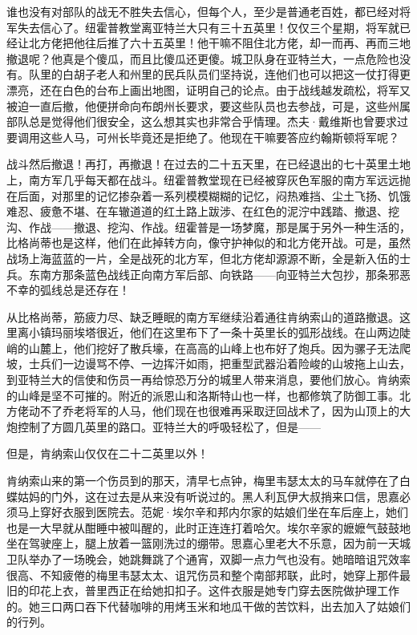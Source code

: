 \par 谁也没有对部队的战无不胜失去信心，但每个人，至少是普通老百姓，都已经对将军失去信心了。纽霍普教堂离亚特兰大只有三十五英里！仅仅三个星期，将军就已经让北方佬把他往后推了六十五英里！他干嘛不阻住北方佬，却一而再、再而三地撤退呢？他真是个傻瓜，而且比傻瓜还更傻。城卫队身在亚特兰大，一点危险也没有。队里的白胡子老人和州里的民兵队员们坚持说，连他们也可以把这一仗打得更漂亮，还在白色的台布上画出地图，证明自己的论点。由于战线越发疏松，将军又被迫一直后撤，他便拼命向布朗州长要求，要这些队员也去参战，可是，这些州属部队总是觉得他们很安全，这么想其实也非常合乎情理。杰夫·戴维斯也曾要求过要调用这些人马，可州长毕竟还是拒绝了。他现在干嘛要答应约翰斯顿将军呢？
\par 战斗然后撤退！再打，再撤退！在过去的二十五天里，在已经退出的七十英里土地上，南方军几乎每天都在战斗。纽霍普教堂现在已经被穿灰色军服的南方军远远抛在后面，对那里的记忆掺杂着一系列模模糊糊的记忆，闷热难挡、尘土飞扬、饥饿难忍、疲惫不堪、在车辙道道的红土路上跋涉、在红色的泥泞中践踏、撤退、挖沟、作战——撤退、挖沟、作战。纽霍普是一场梦魔，那是属于另外一种生活的，比格尚蒂也是这样，他们在此掉转方向，像守护神似的和北方佬开战。可是，虽然战场上海蓝蓝的一片，全是战死的北方军，但北方佬却源源不断，全是新入伍的士兵。东南方那条蓝色战线正向南方军后部、向铁路——向亚特兰大包抄，那条邪恶不幸的弧线总是还存在！
\par 从比格尚蒂，筋疲力尽、缺乏睡眠的南方军继续沿着通往肯纳索山的道路撤退。这里离小镇玛丽埃塔很近，他们在这里布下了一条十英里长的弧形战线。在山两边陡峭的山麓上，他们挖好了散兵壕，在高高的山峰上也布好了炮兵。因为骡子无法爬坡，士兵们一边谩骂不停、一边挥汗如雨，把重型武器沿着险峻的山坡拖上山去，到亚特兰大的信使和伤员一再给惊恐万分的城里人带来消息，要他们放心。肯纳索的山峰是坚不可摧的。附近的派恩山和洛斯特山也一样，也都修筑了防御工事。北方佬动不了乔老将军的人马，他们现在也很难再采取迂回战术了，因为山顶上的大炮控制了方圆几英里的路口。亚特兰大的呼吸轻松了，但是——
\par 但是，肯纳索山仅仅在二十二英里以外！
\par 肯纳索山来的第一个伤员到的那天，清早七点钟，梅里韦瑟太太的马车就停在了白蝶姑妈的门外，这在过去是从来没有听说过的。黑人利瓦伊大叔捎来口信，思嘉必须马上穿好衣服到医院去。范妮·埃尔辛和邦内尔家的姑娘们坐在车后座上，她们也是一大早就从酣睡中被叫醒的，此时正连连打着哈欠。埃尔辛家的嬷嬷气鼓鼓地坐在驾驶座上，腿上放着一篮刚洗过的绷带。思嘉心里老大不乐意，因为前一天城卫队举办了一场晚会，她跳舞跳了个通宵，双脚一点力气也没有。她暗暗诅咒效率很高、不知疲倦的梅里韦瑟太太、诅咒伤员和整个南部邦联，此时，她穿上那件最旧的印花上衣，普里西正在给她扣扣子。这件衣服是她专门穿去医院做护理工作的。她三口两口吞下代替咖啡的用烤玉米和地瓜干做的苦饮料，出去加入了姑娘们的行列。
